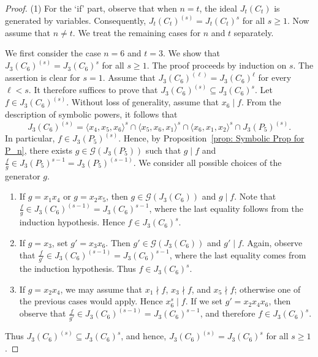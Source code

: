 \documentclass[12pt]{amsart}
\def\l{\langle}
\def\r{\rangle}
\begin{document}
\begin{proof}
    \medskip \noindent
    (1) For the `if' part, observe that when $n=t$, the ideal $J_t(C_t)$ is generated by variables. Consequently, $J_t(C_t)^{(s)} = J_t(C_t)^s$ for all $s \ge 1$. Now assume that $n \ne t$. We treat the remaining cases for $n$ and $t$ separately.

    
    We first consider the case $n=6$ and $t=3$. We show that $J_3(C_6)^{(s)} = J_3(C_6)^s$ for all $s \ge 1$. The proof proceeds by induction on $s$. The assertion is clear for $s=1$. Assume that $J_3(C_6)^{(\ell)} = J_3(C_6)^{\ell}$ for every $\ell < s$. It therefore suffices to prove that $J_3(C_6)^{(s)} \subseteq J_3(C_6)^s.$ Let $f \in J_3(C_6)^{(s)}$. Without loss of generality, assume that $x_6 \mid f$. From the description of symbolic powers, it follows that
    \[
    J_3(C_6)^{(s)} =\l x_4,x_5,x_6 \r^s
    \cap \l x_5,x_6,x_1\r^s
    \cap \l x_6,x_1,x_2 \r^s
    \cap J_3(P_5)^{(s)}.
    \]
    In particular, $f \in J_3(P_5)^{(s)}$. Hence, by Proposition~\ref{prop: Symbolic Prop for P_n}, there exists $g \in \mathcal{G}(J_3(P_5))$ such that $g \mid f$ and $\frac{f}{g} \in J_3(P_5)^{s-1}= J_3(P_5)^{(s-1)}.$ We consider all possible choices of the generator $g$.
    \begin{enumerate}
        \item If $g = x_1x_4$ or $g = x_2x_5$, then $g \in \mathcal{G}(J_3(C_6))$ and $g \mid f$. Note that $\frac{f}{g} \in J_3(C_6)^{(s-1)} = J_3(C_6)^{s-1}$, where the last equality follows from the induction hypothesis. Hence $f \in J_3(C_6)^s$.

        \item If $g = x_3$, set $g' = x_3x_6$. Then $g' \in \mathcal{G}(J_3(C_6))$ and $g' \mid f$. Again, observe that $\frac{f}{g'} \in J_3(C_6)^{(s-1)} = J_3(C_6)^{s-1}$, where the last equality comes from the induction hypothesis. Thus $f \in J_3(C_6)^s$.

        \item If $g = x_2x_4$, we may assume that $x_1 \nmid f$, $x_3 \nmid f$, and $x_5 \nmid f$; otherwise one of the previous cases would apply. Hence $x_6^s \mid f$. If we set $g' = x_2x_4x_6$, then observe that $\frac{f}{g'} \in J_3(C_6)^{(s-1)} = J_3(C_6)^{s-1}$, and therefore $f \in J_3(C_6)^s$.
    \end{enumerate}
    Thus $J_3(C_6)^{(s)} \subseteq J_3(C_6)^s$, and hence, $J_3(C_6)^{(s)} = J_3(C_6)^s$ for all $s \ge 1$.



\end{proof}
\end{document}
